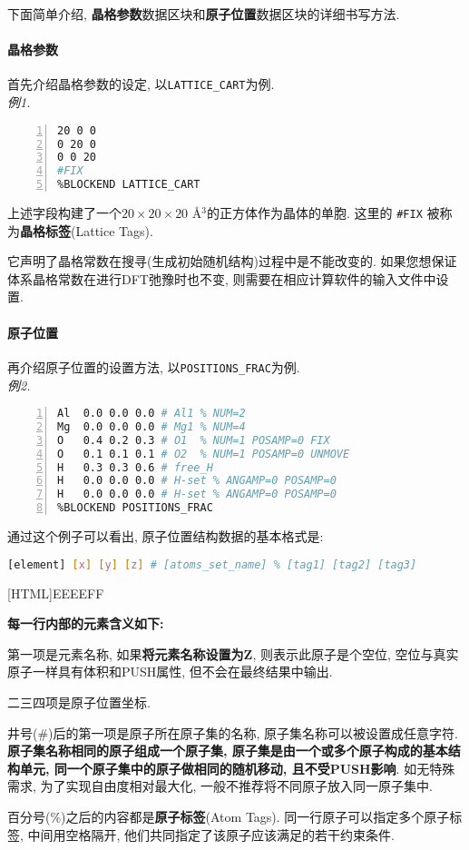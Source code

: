\documentclass[a4paper, 10pt]{article}
\begin{document}
下面简单介绍, \textbf{晶格参数}数据区块和\textbf{原子位置}数据区块的详细书写方法.

\paragraph{晶格参数} 首先介绍晶格参数的设定, 以\verb|LATTICE_CART|为例.\\
\emph{例1.}
\begin{lstlisting}[language={bash},numbers=left]
%BLOCK LATTICE_CART
20 0 0
0 20 0
0 0 20
#FIX
%BLOCKEND LATTICE_CART
\end{lstlisting}

上述字段构建了一个\(20\times20\times20\) \r{A}\(^3\)的正方体作为晶体的单胞. 这里的 \verb|#FIX| 被称为\textbf{晶格标签}(Lattice Tags). 

它声明了晶格常数在搜寻(生成初始随机结构)过程中是不能改变的. 如果您想保证体系晶格常数在进行DFT弛豫时也不变, 则需要在相应计算软件的输入文件中设置.

\paragraph{原子位置} 再介绍原子位置的设置方法, 以\verb|POSITIONS_FRAC|为例.\\
\emph{例2.}
\hypertarget{Aotic Package}{\ }
\begin{lstlisting}[language={bash},numbers=left]
%BLOCK POSITIONS_FRAC
Al  0.0 0.0 0.0 # Al1 % NUM=2 
Mg  0.0 0.0 0.0 # Mg1 % NUM=4 
O   0.4 0.2 0.3 # O1  % NUM=1 POSAMP=0 FIX
O   0.1 0.1 0.1 # O2  % NUM=1 POSAMP=0 UNMOVE
H   0.3 0.3 0.6 # free_H 
H   0.0 0.0 0.0 # H-set % ANGAMP=0 POSAMP=0
H   0.0 0.0 0.0 # H-set % ANGAMP=0 POSAMP=0
%BLOCKEND POSITIONS_FRAC
\end{lstlisting}

通过这个例子可以看出, 原子位置结构数据的基本格式是:
\begin{lstlisting}[language={bash}]
[element] [x] [y] [z] # [atoms_set_name] % [tag1] [tag2] [tag3]
\end{lstlisting}

\noindent{}[HTML]{EEEEFF}{\parbox{\textwidth}{%
\noindent \textbf{每一行内部的元素含义如下: }
\begin{maineu}
  \item 第一项是元素名称, 如果\textbf{将元素名称设置为Z}, 则表示此原子是个空位, 空位与真实原子一样具有体积和PUSH属性, 但不会在最终结果中输出.
  \item 二三四项是原子位置坐标.
  \item 井号(\#)后的第一项是原子所在原子集的名称, 原子集名称可以被设置成任意字符. \textbf{原子集名称相同的原子组成一个原子集, 原子集是由一个或多个原子构成的基本结构单元, 同一个原子集中的原子做相同的随机移动, 且不受PUSH影响}. 如无特殊需求, 为了实现自由度相对最大化, 一般不推荐将不同原子放入同一原子集中.
  \item 百分号(\%)之后的内容都是\textbf{原子标签}(Atom Tags). 同一行原子可以指定多个原子标签, 中间用空格隔开, 他们共同指定了该原子应该满足的若干约束条件.
\end{maineu}}}\\
\end{document}
